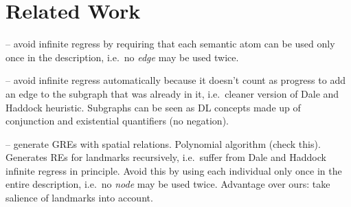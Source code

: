 \section{Related Work} \label{sec:related}

\cite{Dale1995}

\cite{deemter01:_gener_refer_expres}

\cite{dale91:_gener_refer_expres_invol_relat} -- avoid infinite
regress by requiring that each semantic atom can be used only once in
the description, i.e.\ no \emph{edge} may be used twice.

\cite{gardent02:_gener_minim_defin_descr}

\cite{Krahmer2003} -- avoid infinite regress automatically because
it doesn't count as progress to add an edge to the subgraph that was
already in it, i.e.\ cleaner version of Dale and Haddock heuristic.
Subgraphs can be seen as DL concepts made up of conjunction and
existential quantifiers (no negation).

\cite{kelleher06:_increm_gener_of_spatial_refer} -- generate GREs with
spatial relations. Polynomial algorithm (check this). Generates REs
for landmarks recursively, i.e.\ suffer from Dale and Haddock infinite
regress in principle. Avoid this by using each individual only once in
the entire description, i.e.\ no \emph{node} may be used
twice. Advantage over ours: take salience of landmarks into account.

